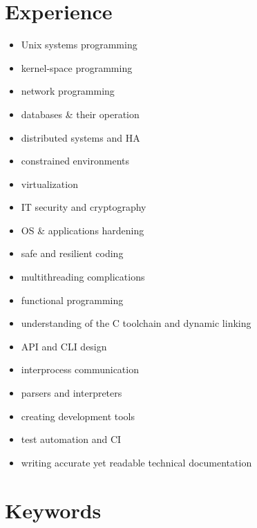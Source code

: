 \documentclass[a4paper,12pt]{article}
\newcommand{\compress}{\setlength\itemsep{-\parskip}}
\newenvironment{compressedItemize}{\begin{itemize}\compress}{\end{itemize}}
\begin{document}
\section{Experience}

\begin{multicols}{3}
\begin{compressedItemize}
\item	Unix systems programming
\item	kernel-space programming
\item	network programming
\item	databases \& their operation
\item	distributed systems and HA
\item	constrained environments
\item	virtualization
\columnbreak
\item	IT security and cryptography
\item	OS \& applications hardening
\item	safe and resilient coding
\item	multithreading complications
\item	functional programming
\item	understanding of the C tool\-chain and dynamic linking
\columnbreak
\item	API and CLI design
\item	interprocess communication
\item	parsers and interpreters
\item	creating development tools
\item	test automation and CI
\item	writing accurate yet readable
	technical documentation
\end{compressedItemize}
\end{multicols}

\section{Keywords}
\end{document}
